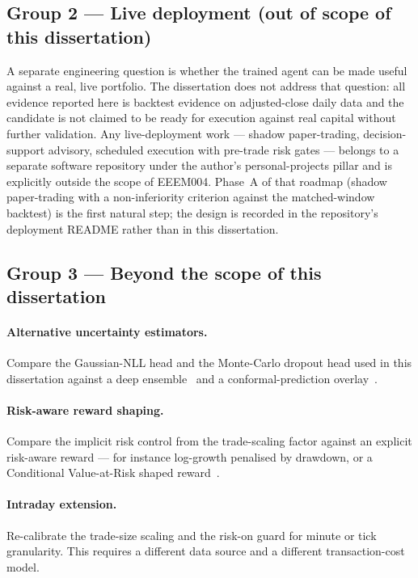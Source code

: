 \subsection{Group 2 --- Live deployment (out of scope of this dissertation)}
\label{sec:group_2_deployment}

A separate engineering question is whether the trained agent can be made useful against a real, live portfolio. The dissertation does not address that question: all evidence reported here is backtest evidence on adjusted-close daily data and the candidate is not claimed to be ready for execution against real capital without further validation. Any live-deployment work --- shadow paper-trading, decision-support advisory, scheduled execution with pre-trade risk gates --- belongs to a separate software repository under the author's personal-projects pillar and is explicitly outside the scope of EEEM004. Phase~A of that roadmap (shadow paper-trading with a non-inferiority criterion against the matched-window backtest) is the first natural step; the design is recorded in the repository's deployment README rather than in this dissertation.

\subsection{Group 3 --- Beyond the scope of this dissertation}
\label{sec:group_3_beyond}

\paragraph{Alternative uncertainty estimators.} Compare the Gaussian-NLL head and the Monte-Carlo dropout head used in this dissertation against a deep ensemble~\parencite{lakshminarayanan2017simple} and a conformal-prediction overlay~\parencite{vovk2005algorithmic}.

\paragraph{Risk-aware reward shaping.} Compare the implicit risk control from the trade-scaling factor against an explicit risk-aware reward --- for instance log-growth penalised by drawdown, or a Conditional Value-at-Risk shaped reward~\parencite{rockafellar2000optimization}.

\paragraph{Intraday extension.} Re-calibrate the trade-size scaling and the risk-on guard for minute or tick granularity. This requires a different data source and a different transaction-cost model.

